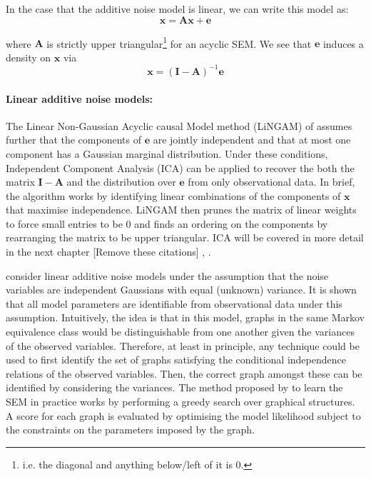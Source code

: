 In the case that the additive noise model is linear, we can write this model as:
\[ \mathbf{x} = \mathbf{A}\mathbf{x} + \mathbf{e} \]

where $\mathbf{A}$ is strictly upper triangular\footnote{i.e. the diagonal and anything below/left of it is 0.} for an acyclic SEM. 
We see that $\mathbf{e}$ induces a density on $\mathbf{x}$ via
\[\mathbf{x} = (\mathbf{I}-\mathbf{A})^{-1} \mathbf{e}\]

\paragraph{Linear additive noise models:}
The Linear Non-Gaussian Acyclic causal Model method (LiNGAM) of \cite{shimizu2006linear} assumes further that the components of $\mathbf{e}$ are jointly independent and that at most one component has a Gaussian marginal distribution. 
Under these conditions, Independent Component Analysis (ICA) can be applied to recover the both the matrix $\mathbf{I}-\mathbf{A}$ and the distribution over $\mathbf{e}$ from only observational data.
In brief, the algorithm works by identifying linear combinations of the components of $\mathbf{x}$ that maximise independence. 
LiNGAM then prunes the matrix of linear weights to force small entries to be 0 and finds an ordering on the components by rearranging the matrix to be upper triangular. 
ICA will be covered in more detail in the next chapter 
[Remove these citations] \cite{hyvarinen2000independent},  \cite{comon1994independent}.

\cite{peters2013identifiability} consider linear additive noise models under the assumption that the noise variables are independent Gaussians with equal (unknown) variance.
It is shown that all model parameters are identifiable from observational data under this assumption. 
Intuitively, the idea is that in this model, graphs in the same Markov equivalence class would be distinguishable from one another given the variances of the observed variables. 
Therefore, at least in principle, any technique could be used to first identify the set of graphs satisfying the conditional independence relations of the observed variables. 
Then, the correct graph amongst these can be identified by considering the variances. 
The method proposed by \cite{peters2013identifiability} to learn the SEM in practice works by performing a greedy search over graphical structures. 
A score for each graph is evaluated by optimising the model likelihood subject to the constraints on the parameters imposed by the graph.

